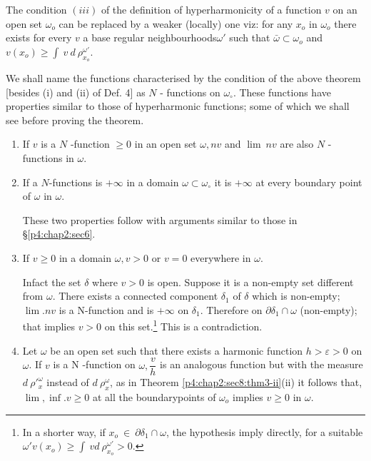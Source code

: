 \begin{thm}\label{p4:chap2:sec9:thm4}%
  The condition $(iii)$ of the definition of hyperharmonicity of a
  function $v$ on an open set $\omega_o$ can be replaced by a weaker
  (locally) one viz: for any $x_o$ in $\omega_o$ there exists for
  every $v$ a base regular neighbourhoods\pageoriginale $\omega'$ such that
  $\bar{\omega} \subset \omega_o$ and $v (x_o) \ge \int ~ v ~ d ~
  \rho^{\omega'}_{x_o}$.
\end{thm}

We shall name the functions characterised by the condition of the
above theorem [besides (i) and (ii) of Def. 4] as $N$ - functions
on $\omega_\circ$. These functions have properties similar to those of
hyperharmonic functions; some of which we shall see before proving the
theorem. 
\begin{enumerate}[1)]
\item If $v $ is a $N$ -function $\ge 0$ in an open set $\omega, nv$ and
  $\lim ~ nv$ are also $N$ - functions in $\omega$. 
\item If a $N$-functions is $+ \infty$ in a domain $\omega \subset
  \omega_\circ$ it is $+ \infty$ at every boundary point of $\omega$ in
  $\omega$. 
  
  These two properties follow with arguments similar to those in
  \S  \ref{p4:chap2:sec6}.
\item If $v \geq 0$ in a domain $\omega, v > 0$ or $v = 0$ everywhere
  in $\omega$.

  Infact the set $\delta$ where $v > 0$ is open. Suppose it is a
  non-empty set different from $\omega$. There exists a connected
  component $\delta_1$ of $\delta$ which is non-empty; $\lim. nv$ is a
  N-function and is $+ \infty$ on $\delta_1$. Therefore on $\partial
  \delta_1 \cap \omega$ (non-empty); that implies $v > 0$ on this
  set.\footnote{In a shorter way, if $x_o ~ \in ~ \partial \delta_1
    \cap \omega$, the hypothesis imply directly, for a suitable
    $\omega' v(x_o) \ge \int ~ vd ~ \rho^{\omega'}_{x_o} > 0$.} This
  is a contradiction. 

\item Let $\omega$  be an open set such that there exists a harmonic
  function $h > \varepsilon > 0$ on $\omega$. If $v$ is a N -function
  on $\omega, \dfrac{v}{h}$ is an analogous function but with the
  measure $d ~ \rho'^{\omega}_x$ instead of $d ~ \rho^\omega_x$, as in
  Theorem \ref{p4:chap2:sec8:thm3-ii}(ii)  it follows that, $\lim, \inf. v \ge 0$ at all
  the boundary\pageoriginale points of $\omega_o$ implies $v \ge 0$ in $\omega$. 
\end{enumerate}

